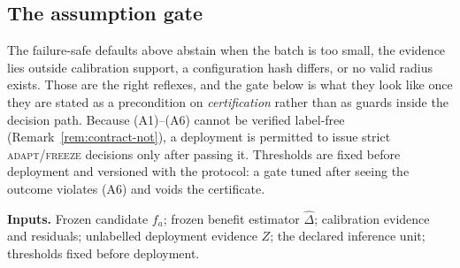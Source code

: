 
\subsection{The assumption gate}\label{sec:gate}

The failure-safe defaults above abstain when the batch is too small, the evidence lies
outside calibration support, a configuration hash differs, or no valid radius exists.
Those are the right reflexes, and the gate below is what they look like once they are
stated as a precondition on \emph{certification} rather than as guards inside the
decision path. Because (A1)--(A6) cannot be verified label-free
(Remark~\ref{rem:contract-not}), a deployment is permitted to issue strict
\textsc{adapt}/\textsc{freeze} decisions only after passing it. Thresholds are fixed
before deployment and versioned with the protocol: a gate tuned after seeing the outcome
violates (A6) and voids the certificate.

\smallskip
\noindent\textbf{Inputs.} Frozen candidate $f_a$; frozen benefit estimator
$\widehat\Delta$; calibration evidence and residuals; unlabelled deployment evidence $Z$;
the declared inference unit; thresholds fixed before deployment.

